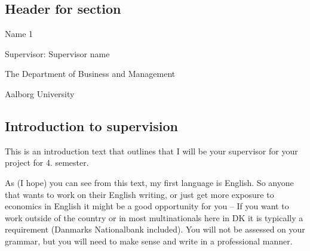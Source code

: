 \documentclass[10pt,twoside]{article}
\begin{document}
\cleardoublepage
\FloatBarrier



\begin{centering}

\vspace{1 cm}

\Huge

\section*{Header for section}
\addtocounter{section}{1}

\vspace{1 cm}

\Large
Name 1

\normalsize
Supervisor: Supervisor name

\vspace{1 cm}

\Large


\vspace{1 cm}

\normalsize
The Department of Business and Management

Aalborg University

\vspace{1 cm}

\end{centering}

\cleardoublepage
\FloatBarrier



\hypertarget{sec:intro-to-supervision}{%
\subsection{Introduction to
supervision}\label{sec:intro-to-supervision}}

This is an introduction text that outlines that I will be your
supervisor for your project for 4. semester.

As (I hope) you can see from this text, my first language is English. So
anyone that wants to work on their English writing, or just get more
exposure to economics in English it might be a good opportunity for you
-- If you want to work outside of the country or in most multinationals
here in DK it is typically a requirement (Danmarks Nationalbank
included). You will not be assessed on your grammar, but you will need
to make sense and write in a professional manner.
\end{document}
